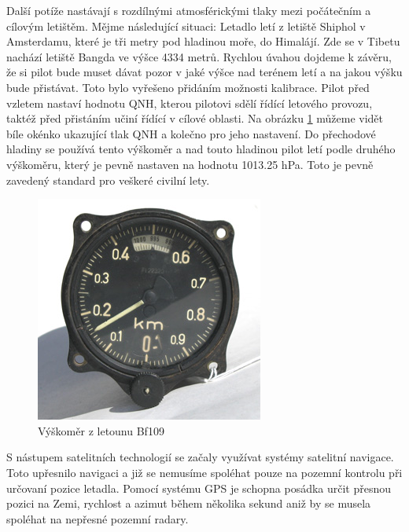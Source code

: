 		Další potíže nastávají s rozdílnými atmosférickými tlaky mezi počátečním a cílovým letištěm. Mějme následující situaci: Letadlo letí z letiště Shiphol v Amsterdamu, které je tři metry pod hladinou moře, do Himalájí. Zde se v Tibetu nachází letiště Bangda ve výšce 4334 metrů\cite{bangda}. Rychlou úvahou dojdeme k závěru, že  si pilot bude muset dávat pozor v jaké výšce nad terénem letí a na jakou výšku bude přistávat. Toto bylo vyřešeno přidáním možnosti kalibrace. Pilot před vzletem nastaví hodnotu QNH, kterou pilotovi sdělí řídící letového provozu, taktéž před přistáním učiní řídící v cílové oblasti. Na obrázku \ref{historie::vyvojMereniVysky::109Altimeter} můžeme vidět bíle okénko ukazující tlak QNH a kolečno pro jeho nastavení. Do přechodové hladiny se používá tento výškoměr a nad touto hladinou pilot letí podle druhého výškoměru, který je pevně nastaven na hodnotu 1013.25 hPa. Toto je pevně zavedený standard pro veškeré civilní lety.\par
		
		\begin{figure}[H]
			\begin{center}
				\includegraphics[scale=0.75]{obrazky-figures/109Altimeter.jpg}
				\caption{Výškoměr z letounu Bf109\protect\footnotemark}\label{historie::vyvojMereniVysky::109Altimeter}
			\end{center}
		\end{figure}
		
		S nástupem satelitních technologií se začaly využívat systémy satelitní navigace. Toto upřesnilo navigaci a již se nemusíme spoléhat pouze na pozemní kontrolu při určovaní pozice letadla. Pomocí systému GPS je schopna posádka určit přesnou pozici na Zemi, rychlost a azimut během několika sekund aniž by se musela spoléhat na nepřesné pozemní radary.\par 
		
